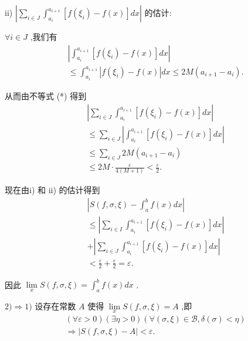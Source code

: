ii) $\left| {\mathop{\sum }\limits_{{i \in  J}}{\int }_{{a}_{i}}^{{a}_{i + 1}}\left\lbrack  {f\left( {\xi }_{i}\right)  - f\left( x\right) }\right\rbrack  {dx}}\right|$ 的估计:

$\forall i \in  J$ ,我们有
\begin{align*}
	&\left| {{\int }_{{a}_{i}}^{{a}_{i + 1}}\left\lbrack  {f\left( {\xi }_{i}\right)  - f\left( x\right) }\right\rbrack  {dx}}\right|\\
	&\leq  {\int }_{{a}_{i}}^{{a}_{i + 1}}\left| {f\left( {\xi }_{i}\right)  - f\left( x\right) }\right| {dx} \leq  {2M}\left( {{a}_{i + 1} - {a}_{i}}\right) .
\end{align*}

从而由不等式 (*) 得到
\begin{align*}
	&\left| {\mathop{\sum }\limits_{{i \in  J}}{\int }_{{a}_{i}}^{{a}_{i + 1}}\left\lbrack  {f\left( {\xi }_{i}\right)  - f\left( x\right) }\right\rbrack  {dx}}\right|\\
	&\leq  \mathop{\sum }\limits_{{i \in  J}}\left| {{\int }_{{a}_{i}}^{{a}_{i + 1}}\left\lbrack  {f\left( {\xi }_{i}\right)  - f\left( x\right) }\right\rbrack  {dx}}\right|\\
	&\leq  \mathop{\sum }\limits_{{i \in  J}}{2M}\left( {{a}_{i + 1} - {a}_{i}}\right)\\
	&\leq  {2M} \cdot  \frac{\varepsilon }{4\left( {M + 1}\right) } < \frac{\varepsilon }{2}.
\end{align*}

现在由i) 和 ii) 的估计得到
\begin{align*}
	&\left| {S\left( {f,\sigma ,\xi }\right)  - {\int }_{a}^{b}f\left( x\right) {dx}}\right|\\
	&\leq  \left| {\mathop{\sum }\limits_{{i \in  I}}{\int }_{{a}_{i}}^{{a}_{i + 1}}\left\lbrack  {f\left( {\xi }_{i}\right)  - f\left( x\right) }\right\rbrack  {dx}}\right|\\
	&+ \left| {\mathop{\sum }\limits_{{i \in  J}}{\int }_{{a}_{i}}^{{a}_{i + 1}}\left\lbrack  {f\left( {\xi }_{i}\right)  - f\left( x\right) }\right\rbrack  {dx}}\right|\\
	&< \frac{\varepsilon }{2} + \frac{\varepsilon }{2} = \varepsilon .
\end{align*}

因此 $\mathop{\lim }\limits_{x}S\left( {f,\sigma ,\xi }\right)  = {\int }_{a}^{b}f\left( x\right) {dx}$ .

$2) \Rightarrow  1)$ 设存在常数 $A$ 使得 $\mathop{\lim }\limits_{x}S\left( {f,\sigma ,\xi }\right)  = A$ ,即
\begin{align*}
	&\left( {\forall \varepsilon  > 0}\right) \left( {\exists \eta  > 0}\right) \left( {\forall \left( {\sigma ,\xi }\right)  \in  \mathcal{B},\delta \left( \sigma \right)  < \eta }\right)\\
	&\Rightarrow  \left| {S\left( {f,\sigma ,\xi }\right)  - A}\right|  < \varepsilon .
\end{align*}

